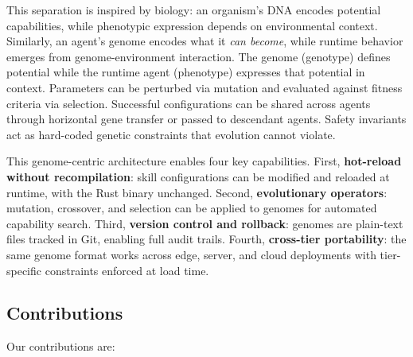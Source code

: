 \documentclass[conference]{IEEEtran}
\begin{document}
This separation is inspired by biology: an organism's DNA encodes potential capabilities, while phenotypic expression depends on environmental context. Similarly, an agent's genome encodes what it \textit{can become}, while runtime behavior emerges from genome-environment interaction. The genome (genotype) defines potential while the runtime agent (phenotype) expresses that potential in context. Parameters can be perturbed via mutation and evaluated against fitness criteria via selection. Successful configurations can be shared across agents through horizontal gene transfer or passed to descendant agents. Safety invariants act as hard-coded genetic constraints that evolution cannot violate.

This genome-centric architecture enables four key capabilities. First, \textbf{hot-reload without recompilation}: skill configurations can be modified and reloaded at runtime, with the Rust binary unchanged. Second, \textbf{evolutionary operators}: mutation, crossover, and selection can be applied to genomes for automated capability search. Third, \textbf{version control and rollback}: genomes are plain-text files tracked in Git, enabling full audit trails. Fourth, \textbf{cross-tier portability}: the same genome format works across edge, server, and cloud deployments with tier-specific constraints enforced at load time.

\subsection{Contributions}

Our contributions are:
\end{document}

